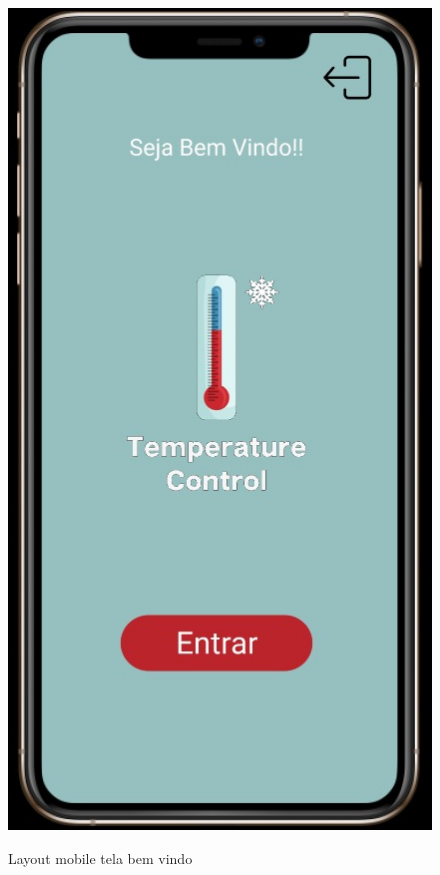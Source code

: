 \documentclass[hidelinks, 12pt, a4paper, brazil, oneside]{abntex2}
\begin{document}
    \begin{figure}[htb!]
        \caption{Layout mobile tela bem vindo}
        \centering
        \includegraphics[scale=0.5]{img/mobile/bem_vindo.png}
        \label{fig:mobileBemVindo}
    \end{figure}
\end{document}
